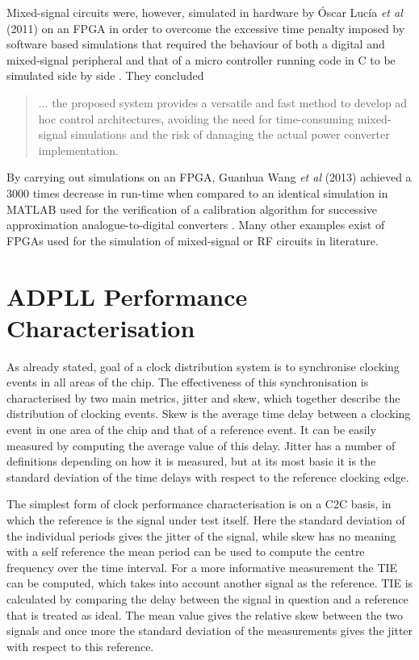 Mixed-signal circuits were, however, simulated in hardware by \'{O}scar Luc\'{i}a \textit{et al} (2011) on an \ac{FPGA} in order to overcome the excessive time penalty imposed by software based simulations that required the behaviour of both a digital and mixed-signal peripheral and that of a micro controller running code in C to be simulated side by side \cite{lucia2011real}. They concluded
\begin{quotation}
	... the proposed system provides a versatile and fast method to develop ad hoc control architectures, avoiding the need for time-consuming mixed-signal simulations and the risk of damaging the actual power converter implementation.

\end{quotation}
By carrying out simulations on an \ac{FPGA}, Guanhua Wang \textit{et al} (2013) achieved a 3000 times decrease in run-time when compared to an identical simulation in MATLAB used for the verification of a calibration algorithm for successive approximation analogue-to-digital converters \cite{wang2013fast}. Many other examples exist of \ac{FPGA}s used for the simulation of mixed-signal or \acl{RF} circuits in literature.

\section{\acs{ADPLL} Performance Characterisation}
As already stated, goal of a clock distribution system is to synchronise clocking events in all areas of the chip. The effectiveness of this synchronisation is characterised by two main metrics, jitter and skew, which together describe the distribution of clocking events. Skew is the average time delay between a clocking event in one area of the chip and that of a reference event. It can be easily measured by computing the average value of this delay. Jitter has a number of definitions depending on how it is measured, but at its most basic it is the standard deviation of the time delays with respect to the reference clocking edge.

The simplest form of clock performance characterisation is on a \ac{C2C} basis, in which the reference is the signal under test itself. Here the standard deviation of the individual periods gives the jitter of the signal, while skew has no meaning with a self reference the mean period can be used to compute the centre frequency over the time interval. For a more informative measurement the \ac{TIE} can be computed, which takes into account another signal as the reference. \ac{TIE} is calculated by comparing the delay between the signal in question and a reference that is treated as ideal. The mean value gives the relative skew between the two signals and once more the standard deviation of the measurements gives the jitter with respect to this reference.

